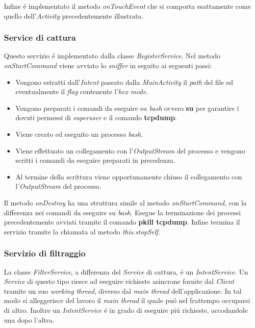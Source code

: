 \documentclass[12pt]{article} %
\begin{document}
Infine \'e implementato il metodo \textit{onTouchEvent} che si comporta esattamente come quello dell'\textit{Activity} precedentemente illustrata.

\subsubsection{Service di cattura}
Questo servizio \'e implementato dalla classe \textit{RegisterService}. Nel metodo \textit{onStartCommand} viene avviato lo \textit{sniffer} in seguito ai seguenti passi:

\begin{itemize}
\item Vengono estratti dall'\textit{Intent} passato dalla \textit{MainActivity} il \textit{path} del file ed eventualmente il \textit{flag} contenente l'\textit{hex mode}.
\item Vengono preparati i comandi da eseguire su \textit{bash} ovvero \textbf{su} per garantire i dovuti permessi di \textit{superuser} e il comando \textbf{tcpdump}.
\item Viene creato ed eseguito un processo \textit{bash}.
\item Viene effettuato un collegamento con l'\textit{OutputStream} del processo e vengono scritti i comandi da eseguire preparati in precedenza.
\item Al termine della scrittura viene opportunamente chiuso il collegamento con l'\textit{OutputStream} del processo.
\end{itemize}

Il metodo \textit{onDestroy} ha una struttura simile al metodo \textit{onStartCommand}, con la differenza nei comandi da eseguire su \textit{bash}. Esegue la terminazione dei processi precedentemente avviati tramite il comando \textbf{pkill tcpdump}. Infine termina il servizio tramite la chiamata al metodo \textit{this.stopSelf}. 

\subsubsection{Servizio di filtraggio}
La classe \textit{FilterService}, a differenza del \textit{Service} di cattura, \'e un \textit{IntentService}. Un \textit{Service} di questo tipo riesce ad eseguire richieste asincrone fornite dal \textit{Client} tramite un suo \textit{working thread}, diverso dal \textit{main thread} dell'applicazione. In tal modo si alleggerisce del lavoro il \textit{main thread} il quale pu\'o nel frattempo occuparsi di altro. Inoltre un \textit{IntentService} \'e in grado di eseguire pi\'u richieste, accodandole una dopo l'altra.
\end{document}
